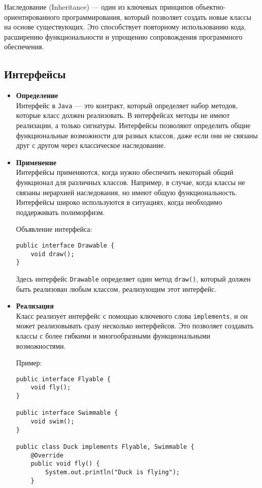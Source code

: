 Наследование (Inheritance) — один из ключевых принципов объектно-ориентированного программирования, который позволяет создать новые классы на основе существующих. Это способствует повторному использованию кода, расширению функциональности и упрощению сопровождения программного обеспечения.

\subsection{Интерфейсы}
\begin{itemize}
    \item \textbf{Определение} \\
    Интерфейс в \texttt{Java} — это контракт, который определяет набор методов, которые класс должен реализовать. В интерфейсах методы не имеют реализации, а только сигнатуры. Интерфейсы позволяют определить общие функциональные возможности для разных классов, даже если они не связаны друг с другом через классическое наследование.


    \item \textbf{Применение} \\
    Интерфейсы применяются, когда нужно обеспечить некоторый общий функционал для различных классов. Например, в случае, когда классы не связаны иерархией наследования, но имеют общую функциональность. Интерфейсы широко используются в ситуациях, когда необходимо поддерживать полиморфизм.

    Объявление интерфейса:
    \begin{verbatim}
public interface Drawable {
    void draw();
}
    \end{verbatim}
    Здесь интерфейс \texttt{Drawable} определяет один метод \texttt{draw()}, который должен быть реализован любым классом, реализующим этот интерфейс.


    \item \textbf{Реализация} \\
    Класс реализует интерфейс с помощью ключевого слова \texttt{implements}, и он может реализовывать сразу несколько интерфейсов. Это позволяет создавать классы с более гибкими и многообразными функциональными возможностями.

    Пример:
    \begin{verbatim}
public interface Flyable {
    void fly();
}

public interface Swimmable {
    void swim();
}

public class Duck implements Flyable, Swimmable {
    @Override
    public void fly() {
        System.out.println("Duck is flying");
    }


\end{verbatim}
\end{itemize}
